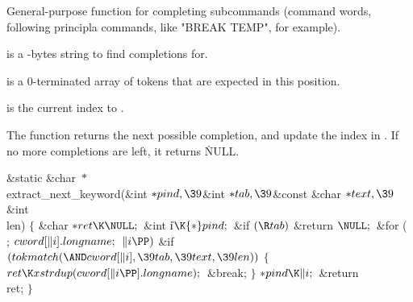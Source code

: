 General-purpose function for completing subcommands (command words,
following principla commands, like "BREAK TEMP", for example).

 is a -bytes string to find completions for.\par
{} is a 0-terminated array of tokens that are expected in this
position.\par
{} is the current index to .

The function returns the next possible completion, and update the index
in . If no more completions are left, it returns \.{NULL}.

\Y\B\&{static} \&{char} ${}{*}{}$\\{extract\_next\_keyword}(\&{int} ${}{*}%
\\{pind},\39{}$\&{int} ${}{*}\\{tab},\39{}$\&{const} \&{char} ${}{*}\\{text},%
\39{}$\&{int} \\{len})\1\1\2\2\6
${}\{{}$\1\6
\&{char} ${}{*}\\{ret}\K\NULL;{}$\6
\&{int} \|i${}\K{*}\\{pind};{}$\7
\&{if} ${}(\R\\{tab}){}$\1\5
\&{return} ${}\NULL;{}$\2\6
\&{for} ( ; ${}\\{cword}[\|i].\\{longname};{}$ ${}\|i\PP){}$\1\6
\&{if} ${}(\\{tokmatch}({\AND}\\{cword}[\|i],\39\\{tab},\39\\{text},\39%
\\{len})){}$\5
${}\{{}$\1\6
${}\\{ret}\K\\{xstrdup}(\\{cword}[\|i\PP].\\{longname});{}$\6
\&{break};\6
\4${}\}{}$\2\2\6
${}{*}\\{pind}\K\|i;{}$\6
\&{return} \\{ret};\6
\4${}\}{}$\2\par
\fi

